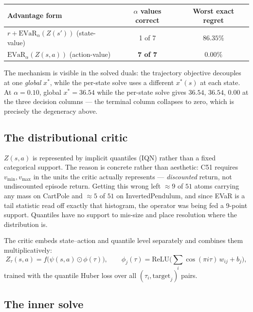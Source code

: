 \documentclass[11pt,a4paper]{article}
\newcommand{\evar}{\mathrm{EVaR}}
\begin{document}
\begin{center}
\small
\begin{tabular}{@{}lcc@{}}
\toprule
\textbf{Advantage form} & \textbf{$\alpha$ values correct} & \textbf{Worst exact regret} \\
\midrule
$r + \evar_\alpha(Z(s'))$ \quad (state-value) & 1 of 7 & $86.35\%$ \\
$\evar_\alpha(Z(s,a))$ \quad (action-value) & \textbf{7 of 7} & $\mathbf{0.00\%}$ \\
\bottomrule
\end{tabular}
\end{center}

\noindent The mechanism is visible in the solved duals: the trajectory objective
decouples at one \emph{global} $x^\ast$, while the per-state solve uses a different
$x^\ast(s)$ at each state. At $\alpha = 0.10$, global $x^\ast = 36.54$ while the
per-state solve gives $36.54$, $36.54$, $0.00$ at the three decision columns --- the
terminal column collapses to zero, which is precisely the degeneracy above.

\subsection{The distributional critic}

$Z(s,a)$ is represented by implicit quantiles (IQN) rather than a fixed categorical
support. The reason is concrete rather than aesthetic: C51 requires $v_{\min},
v_{\max}$ in the units the critic actually represents --- \emph{discounted} return,
not undiscounted episode return. Getting this wrong left $\approx 9$ of $51$ atoms
carrying any mass on CartPole and $\approx 5$ of $51$ on InvertedPendulum, and
since EVaR is a tail statistic read off exactly that histogram, the operator was
being fed a 9-point support. Quantiles have no support to mis-size and place
resolution where the distribution is.

The critic embeds state--action and quantile level separately and combines them
multiplicatively:
\begin{equation}
Z_\tau(s,a) = f\Big(\psi(s,a) \odot \phi(\tau)\Big), \qquad
\phi_j(\tau) = \mathrm{ReLU}\Big(\textstyle\sum_{i} \cos(\pi i \tau)\,w_{ij} + b_j\Big),
\end{equation}
trained with the quantile Huber loss over all $(\tau_i, \text{target}_j)$ pairs.

\subsection{The inner solve}
\end{document}
